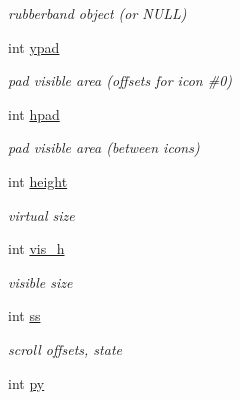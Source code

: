 \begin{CompactItemize}
\begin{CompactList}\small\item\em rubberband object (or NULL) \item\end{CompactList}\item 
\hypertarget{struct__icon__list_o7}{
int \hyperlink{struct__icon__list_o7}{ypad}}
\label{struct__icon__list_o7}

\begin{CompactList}\small\item\em pad visible area (offsets for icon \#0) \item\end{CompactList}\item 
\hypertarget{struct__icon__list_o9}{
int \hyperlink{struct__icon__list_o9}{hpad}}
\label{struct__icon__list_o9}

\begin{CompactList}\small\item\em pad visible area (between icons) \item\end{CompactList}\item 
\hypertarget{struct__icon__list_o11}{
int \hyperlink{struct__icon__list_o11}{height}}
\label{struct__icon__list_o11}

\begin{CompactList}\small\item\em virtual size \item\end{CompactList}\item 
\hypertarget{struct__icon__list_o13}{
int \hyperlink{struct__icon__list_o13}{vis\_\-h}}
\label{struct__icon__list_o13}

\begin{CompactList}\small\item\em visible size \item\end{CompactList}\item 
\hypertarget{struct__icon__list_o16}{
int \hyperlink{struct__icon__list_o16}{ss}}
\label{struct__icon__list_o16}

\begin{CompactList}\small\item\em scroll offsets, state \item\end{CompactList}\item 
\hypertarget{struct__icon__list_o18}{
int \hyperlink{struct__icon__list_o18}{py}}
\label{struct__icon__list_o18}


\end{CompactItemize}
